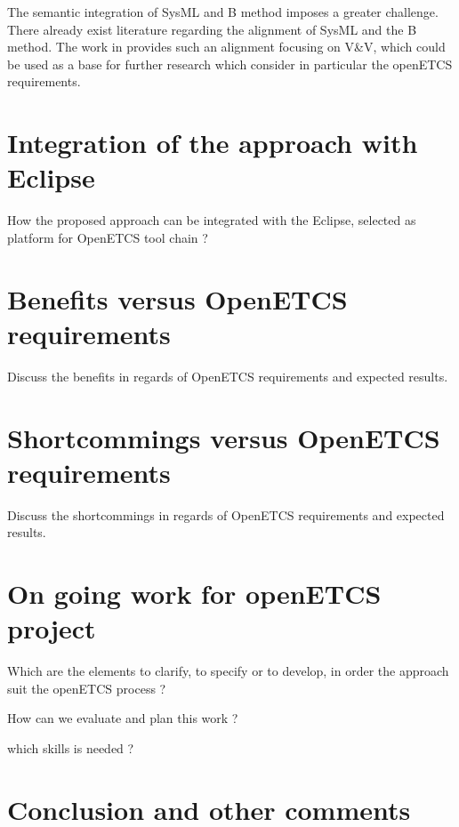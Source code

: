 The semantic integration of SysML and B method imposes a greater
challenge. There already exist literature regarding the alignment of
SysML and the B method. The work in \cite{} provides such an alignment
focusing on V\&V, which could be used as a base for further research
which consider in particular the openETCS requirements.


\section{Integration of the approach with Eclipse}

\begin{todo_comment}
How the proposed approach can be integrated with the Eclipse, selected as platform for OpenETCS tool chain ?
\end{todo_comment}

\section{Benefits versus OpenETCS requirements}

\begin{todo_comment}
Discuss the benefits in regards of OpenETCS requirements and expected results.
\end{todo_comment}

\section{Shortcommings versus OpenETCS requirements}

\begin{todo_comment}
Discuss the shortcommings in regards of OpenETCS requirements and expected results.
\end{todo_comment}

\section{On going work for openETCS project}

\begin{todo_comment}
Which are the elements to clarify, to specify or to develop, in order the approach suit the openETCS process ?

How can we evaluate and plan this work ?

which skills is needed ?
\end{todo_comment}

\section{Conclusion and other comments}
